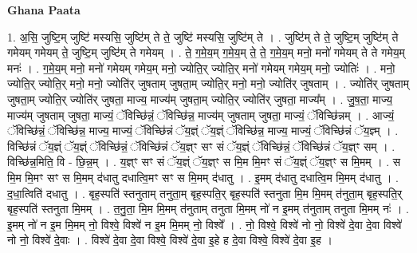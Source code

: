 \documentclass[17pt]{extarticle}
\begin{document}
\textbf{Ghana Paata } \newline

1. अ॒सि॒ जुष्टि॒म् जुष्टि॑ मस्यसि॒ जुष्टि॑म् ते ते॒ जुष्टि॑ मस्यसि॒ जुष्टि॑म् ते । . जुष्टि॑म् ते ते॒ जुष्टि॒म् जुष्टि॑म् ते गमेयम् गमेयम् ते॒ जुष्टि॒म् जुष्टि॑म् ते गमेयम् । . ते॒ ग॒मे॒य॒म् ग॒मे॒य॒म् ते॒ ते॒ ग॒मे॒य॒म् मनो॒ मनो॑ गमेयम् ते ते गमेय॒म् मनः॑ । . ग॒मे॒य॒म् मनो॒ मनो॑ गमेयम् गमेय॒म् मनो॒ ज्योति॒र् ज्योति॒र् मनो॑ गमेयम् गमेय॒म् मनो॒ ज्योतिः॑ । . मनो॒ ज्योति॒र् ज्योति॒र् मनो॒ मनो॒ ज्योति॑र् जुषताम् जुषता॒म् ज्योति॒र् मनो॒ मनो॒ ज्योति॑र् जुषताम् । . ज्योति॑र् जुषताम् जुषता॒म् ज्योति॒र् ज्योति॑र् जुषता॒ माज्य॒ माज्य॑म् जुषता॒म् ज्योति॒र् ज्योति॑र् जुषता॒ माज्य᳚म् । . जु॒ष॒ता॒ माज्य॒ माज्य॑म् जुषताम् जुषता॒ माज्यं॒ ॅविच्छि॑न्नं॒ ॅविच्छि॑न्न॒ माज्य॑म् जुषताम् जुषता॒ माज्यं॒ ॅविच्छि॑न्नम् । . आज्यं॒ ॅविच्छि॑न्नं॒ ॅविच्छि॑न्न॒ माज्य॒ माज्यं॒ ॅविच्छि॑न्नं ॅय॒ज्ञ्ं ॅय॒ज्ञ्ं ॅविच्छि॑न्न॒ माज्य॒ माज्यं॒ ॅविच्छि॑न्नं ॅय॒ज्ञ्म् । . विच्छि॑न्नं ॅय॒ज्ञ्ं ॅय॒ज्ञ्ं ॅविच्छि॑न्नं॒ ॅविच्छि॑न्नं ॅय॒ज्ञ्ꣳ सꣳ सं ॅय॒ज्ञ्ं ॅविच्छि॑न्नं॒ ॅविच्छि॑न्नं ॅय॒ज्ञ्ꣳ सम् । . विच्छि॑न्न॒मिति॒ वि - छि॒न्न॒म् । . य॒ज्ञ्ꣳ सꣳ सं ॅय॒ज्ञ्ं ॅय॒ज्ञ्ꣳ स मि॒म मि॒मꣳ सं ॅय॒ज्ञ्ं ॅय॒ज्ञ्ꣳ स मि॒मम् । . स मि॒म मि॒मꣳ सꣳ स मि॒मम् द॑धातु दधात्वि॒मꣳ सꣳ स मि॒मम् द॑धातु । . इ॒मम् द॑धातु दधात्वि॒म मि॒मम् द॑धातु । . द॒धा॒त्विति॑ दधातु । . बृह॒स्पति॑ स्तनुताम् तनुता॒म् बृह॒स्पति॒र् बृह॒स्पति॑ स्तनुता मि॒म मि॒मम् त॑नुता॒म् बृह॒स्पति॒र् बृह॒स्पति॑ स्तनुता मि॒मम् । . त॒नु॒ता॒ मि॒म मि॒मम् त॑नुताम् तनुता मि॒मम् नो॑ न इ॒मम् त॑नुताम् तनुता मि॒मम् नः॑ । . इ॒मम् नो॑ न इ॒म मि॒मम् नो॒ विश्वे॒ विश्वे॑ न इ॒म मि॒मम् नो॒ विश्वे᳚ । . नो॒ विश्वे॒ विश्वे॑ नो नो॒ विश्वे॑ दे॒वा दे॒वा विश्वे॑ नो नो॒ विश्वे॑ दे॒वाः । . विश्वे॑ दे॒वा दे॒वा विश्वे॒ विश्वे॑ दे॒वा इ॒हे ह दे॒वा विश्वे॒ विश्वे॑ दे॒वा इ॒ह । \newline
\end{document}
